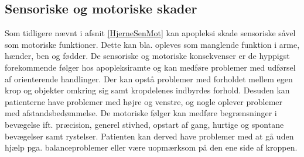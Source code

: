 \subsection{Sensoriske og motoriske skader} %
Som tidligere nævnt i afsnit \ref{HjerneSenMot} kan apopleksi skade sensoriske såvel som motoriske funktioner. Dette kan bla. opleves som manglende funktion i arme, hænder, ben og fødder. De sensoriske og motoriske konsekvenser er de hyppigst forekommende følger hos apopleksiramte og kan medføre problemer med udførsel af orienterende handlinger. Der kan opstå problemer med forholdet mellem egen krop og objekter omkring sig samt kropdelenes indbyrdes forhold. Desuden kan patienterne have problemer med højre og venstre, og nogle oplever problemer med afstandsbedømmelse. De motoriske følger kan medføre  begrænsninger i bevægelse ift. præcision, generel stivhed, opstart af gang, hurtige og spontane bevægelser samt rystelser. Patienten kan derved have problemer med at gå uden hjælp pga. balanceproblemer eller være uopmærksom på den ene side af kroppen. \cite{Sundhed.dk,DSfA2009}

